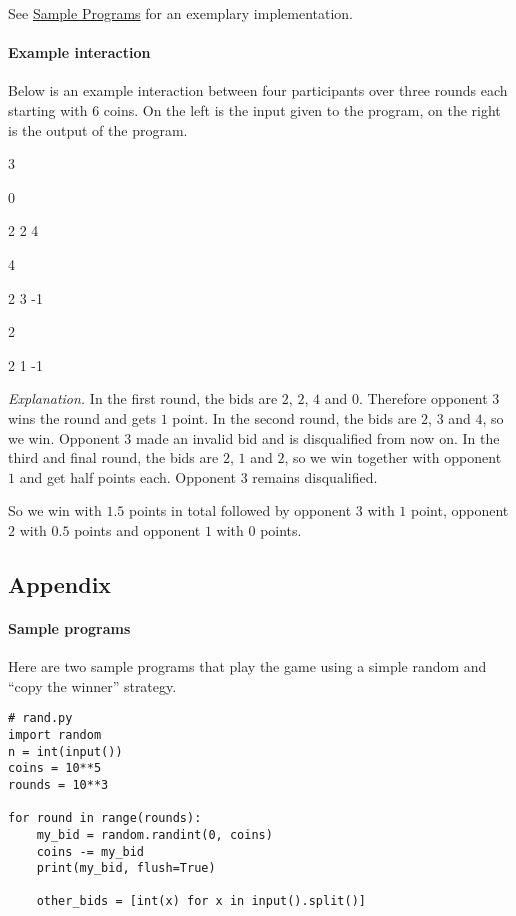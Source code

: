 \documentclass[
    a4paper,
    12pt,
    parskip=half,
    headings=standardclasses,
    footskip=0pt,
    footlines=1,
    headheight=80in
]{scrartcl}
\newcommand{\lgrey}{black!5}
\begin{document}
See \hyperref[sample-programs]{Sample Programs} for an exemplary implementation.

\paragraph*{Example interaction} Below is an example interaction between four participants over three rounds
each starting with $6$ coins. On the left is the input given to the program, on the right is the output of the program.

\begin{tcolorbox}[colback=\lgrey,fontupper=\small\ttfamily]
3

\hfill0

2 2 4

\hfill4

2 3 -1

\hfill2

2 1 -1
\end{tcolorbox}

\textit{Explanation.} In the first round, the bids are $2$, $2$, $4$ and $0$. Therefore opponent $3$ wins the round and gets $1$ point.
In the second round, the bids are $2$, $3$ and $4$, so we win. Opponent $3$ made an invalid bid and is disqualified from now on.
In the third and final round, the bids are $2$, $1$ and $2$, so we win together with opponent $1$ and get half points each.
Opponent $3$ remains disqualified.

So we win with $1.5$ points in total followed by opponent $3$ with $1$ point, opponent $2$ with $0.5$ points and opponent $1$ with $0$ points.

\clearpage

\subsection*{Appendix}

\paragraph*{Sample programs}\label{sample-programs}

Here are two sample programs that play the game using a simple random and ``copy the
winner'' strategy.

\begin{verbatim}
# rand.py
import random
n = int(input())
coins = 10**5
rounds = 10**3

for round in range(rounds):
    my_bid = random.randint(0, coins)
    coins -= my_bid
    print(my_bid, flush=True)
    
    other_bids = [int(x) for x in input().split()]
\end{verbatim}
\end{document}
